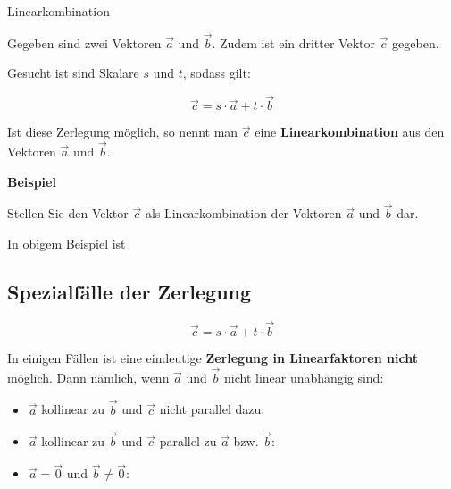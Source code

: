 \begin{definition}{Linearkombination}{}

  Gegeben sind zwei Vektoren $\vec{a}$ und
  $\vec{b}$. Zudem ist ein dritter Vektor $\vec{c}$ gegeben.

  Gesucht ist sind Skalare $s$ und $t$, sodass gilt:

  $$\vec{c} = s\cdot{}\vec{a} + t\cdot{}\vec{b}$$

  Ist diese Zerlegung möglich, so nennt man $\vec{c}$
  eine \textbf{Linearkombination} aus den Vektoren $\vec{a}$ und $\vec{b}$.
\end{definition}
\newpage


\textbf{Beispiel}

Stellen Sie den Vektor $\vec{c}$ als Linearkombination der Vektoren
$\vec{a}$ und $\vec{b}$ dar.


In obigem Beispiel ist


\subsection{Spezialfälle der Zerlegung}

$$\vec{c} = s\cdot{}\vec{a} + t\cdot{}\vec{b}$$

In einigen Fällen ist eine eindeutige \textbf{Zerlegung in Linearfaktoren
  nicht} möglich. Dann nämlich, wenn $\vec{a}$ und $\vec{b}$ nicht
linear unabhängig sind:

\begin{itemize}
\item $\vec{a}$ kollinear zu $\vec{b}$ und $\vec{c}$ nicht parallel dazu: 

\item $\vec{a}$ kollinear zu $\vec{b}$ und $\vec{c}$ parallel zu $\vec{a}$ bzw. $\vec{b}$: 

\item $\vec{a} = \overrightarrow{0}$ und $\vec{b}  \ne \overrightarrow{0}$: 

  
\end{itemize}


